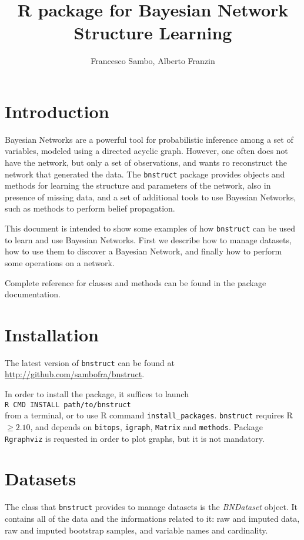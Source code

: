 \documentclass{article}
\newcommand{\Rpackage}[1]{{\texttt{#1}}}
\newcommand{\Rclass}[1]{{\textit{#1}}}
\begin{document}


\title{R package for Bayesian Network Structure Learning}
\author{Francesco Sambo, Alberto Franzin}
\maketitle


\section{Introduction}
Bayesian Networks are a powerful tool for probabilistic inference among a set
of variables, modeled using a directed acyclic graph. However, one often does not
have the network, but only a set of observations, and wants ro reconstruct the
network that generated the data. The \Rpackage{bnstruct} package provides objects and methods for
learning the structure and parameters of the network, also in presence of missing data,
and a set of additional tools to use Bayesian Networks, such as methods to perform
belief propagation.

This document is intended to show some examples of how \Rpackage{bnstruct} can be used
to learn and use Bayesian Networks. First we describe how to manage datasets,
how to use them to discover a Bayesian Network, and finally how to perform some
operations on a network.

Complete reference for classes and methods can be found in the package documentation.

\section{Installation}

The latest version of \Rpackage{bnstruct} can be found at \url{http://github.com/sambofra/bnstruct}.

In order to install the package, it suffices to launch\\
\verb!R CMD INSTALL path/to/bnstruct!\\
from a terminal, or to use R command \verb!install_packages!. \Rpackage{bnstruct} requires R $\geq 2.10$,
and depends on \Rpackage{bitops}, \Rpackage{igraph}, \Rpackage{Matrix} and \Rpackage{methods}.
Package \Rpackage{Rgraphviz} is requested in order to plot graphs, but it is not mandatory.


\section{Datasets}
The class that \Rpackage{bnstruct} provides to manage datasets is the \Rclass{BNDataset} object.
It contains all of the data and the informations related to it: raw and imputed data, raw and imputed
bootstrap samples, and variable names and cardinality.
\end{document}
